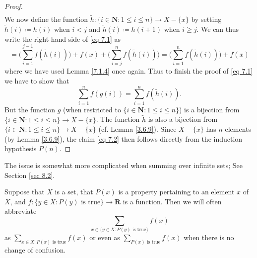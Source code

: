 \begin{proof}
\begin{align*}
    \end{align*}
    We now define the function \(\tilde{h} : \{i \in \mathbf{N} : 1 \leq i \leq n\} \to X - \{x\}\) by setting \(\tilde{h}(i) \coloneqq h(i)\) when \(i < j\) and \(\tilde{h}(i) \coloneqq h(i + 1)\) when \(i \geq j\).
    We can thus write the right-hand side of \eqref{eq 7.1} as
    \[
        = \Bigg(\sum_{i = 1}^{j - 1} f(\tilde{h}(i))\Bigg) + f(x) + \Bigg(\sum_{i = j}^n f(\tilde{h}(i))\Bigg) = \Bigg(\sum_{i = 1}^n f(\tilde{h}(i))\Bigg) + f(x)
    \]
    where we have used Lemma \ref{7.1.4} once again.
    Thus to finish the proof of \eqref{eq 7.1} we have to show that
    \[
        \sum_{i = 1}^n f(g(i)) = \sum_{i = 1}^n f(\tilde{h}(i)). \tag{7.2}\label{eq 7.2}
    \]
    But the function \(g\) (when restricted to \(\{i \in \mathbf{N} : 1 \leq i \leq n\}\)) is a bijection from \(\{i \in \mathbf{N} : 1 \leq i \leq n\} \to X - \{x\}\).
    The function \(\tilde{h}\) is also a bijection from \(\{i \in \mathbf{N} : 1 \leq i \leq n\} \to X - \{x\}\) (cf. Lemma \ref{3.6.9}).
    Since \(X - \{x\}\) has \(n\) elements (by Lemma \ref{3.6.9}), the claim \eqref{eq 7.2} then follows directly from the induction hypothesis \(P(n)\).
\end{proof}

\begin{remark}\label{7.1.9}
    The issue is somewhat more complicated when summing over infinite sets;
    See Section \ref{sec 8.2}.
\end{remark}

\begin{remark}\label{7.1.10}
    Suppose that \(X\) is a set, that \(P(x)\) is a property pertaining to an element \(x\) of \(X\), and \(f : \{y \in X : P(y) \text{ is true}\} \to \mathbf{R}\) is a function.
    Then we will often abbreviate
    \[
        \sum_{x \in \{y \in X : P(y) \text{ is true}\}} f(x)
    \]
    as \(\sum_{x \in X : P(x) \text{ is true}} f(x)\) or even as \(\sum_{P(x) \text{ is true}} f(x)\) when there is no change of confusion.
\end{remark}


